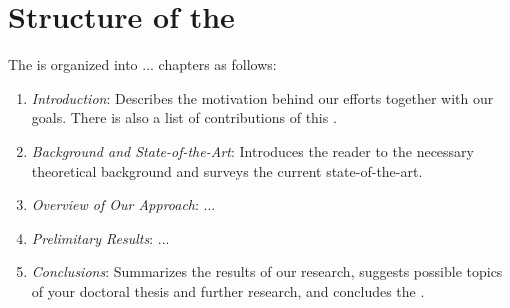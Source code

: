 \section{Structure of the \Thesis{}}
The \thesis{} is organized into ... chapters as follows:
\begin{enumerate}
\item \emph{Introduction}: Describes the motivation behind our efforts together with our goals. There is also a list of contributions of this \thesis. 

\item \emph{Background and State-of-the-Art}: Introduces the reader to the necessary theoretical background and surveys the current state-of-the-art.

\item \emph{Overview of Our Approach}: ...

\item \emph{Prelimitary Results}: ...

\item \emph{Conclusions}: Summarizes the results of our research, suggests possible topics of your doctoral thesis and further research, and concludes the \thesis.
\end{enumerate}
